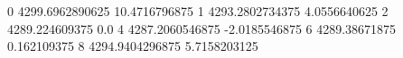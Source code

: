 0 4299.6962890625 10.4716796875
1 4293.2802734375 4.0556640625
2 4289.224609375 0.0
4 4287.2060546875 -2.0185546875
6 4289.38671875 0.162109375
8 4294.9404296875 5.7158203125
